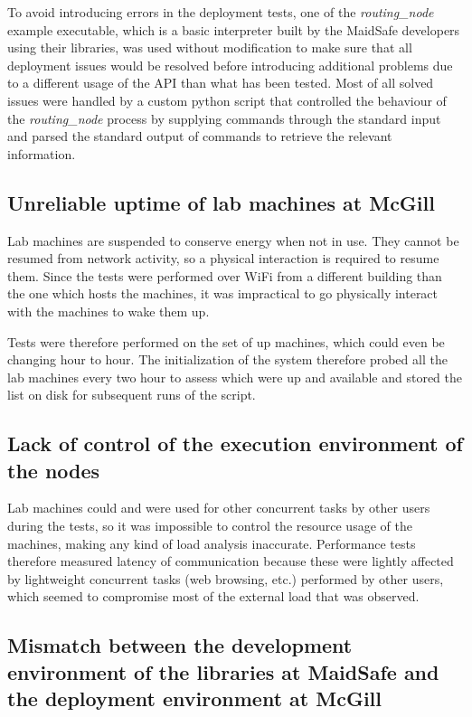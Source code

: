 To avoid introducing errors in the deployment tests, one of the \textit{routing\_node} example executable, which is a basic interpreter built by the MaidSafe developers using their libraries, was used without modification to make sure that all deployment issues would be resolved before introducing additional problems due to a different usage of the API than what has been tested. Most of all solved issues were handled by a custom python script that controlled the behaviour of the \textit{routing\_node} process by supplying commands through the standard input and parsed the standard output of commands to retrieve the relevant information.

\subsection{Unreliable uptime of lab machines at McGill}

Lab machines are suspended to conserve energy when not in use. They cannot be resumed from network activity, so a physical interaction is required to resume them. Since the tests were performed over WiFi from a different building than the one which hosts the machines, it was impractical to go physically interact with the machines to wake them up. 

Tests were therefore performed on the set of up machines, which could even be changing hour to hour. The initialization of the system therefore probed all the lab machines every two hour to assess which were up and available and stored the list on disk for subsequent runs of the script.

\subsection{Lack of control of the execution environment of the nodes}

Lab machines could and were used for other concurrent tasks by other users during the tests, so it was impossible to control the resource usage of the machines, making any kind of load analysis inaccurate. Performance tests therefore measured latency of communication because these were lightly affected by lightweight concurrent tasks (web browsing, etc.) performed by other users, which seemed to compromise most of the external load that was observed.

\subsection{Mismatch between the development environment of the libraries at MaidSafe and the deployment environment at McGill}

